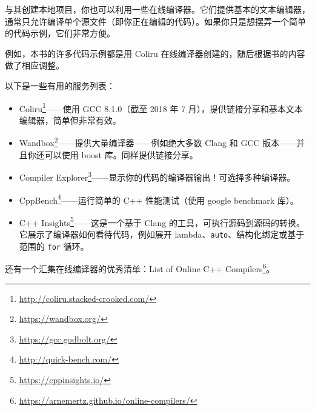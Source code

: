 与其创建本地项目，你也可以利用一些在线编译器。它们提供基本的文本编辑器，通常只允许编译单个源文件（即你正在编辑的代码）。如果你只是想摆弄一个简单的代码示例，它们非常方便。

例如，本书的许多代码示例都是用 Coliru 在线编译器创建的，随后根据书的内容做了相应调整。

以下是一些有用的服务列表：

\begin{itemize}
  \item Coliru\footnote{\url{http://coliru.stacked-crooked.com/}}——使用 GCC 8.1.0（截至 2018 年 7 月），提供链接分享和基本文本编辑器，简单但非常有效。
  \item Wandbox\footnote{\url{https://wandbox.org/}}——提供大量编译器——例如绝大多数 Clang 和 GCC 版本——并且你还可以使用 boost 库。同样提供链接分享。
  \item Compiler Explorer\footnote{\url{https://gcc.godbolt.org/}}——显示你的代码的编译器输出！可选择多种编译器。
  \item CppBench\footnote{\url{http://quick-bench.com/}}——运行简单的 C++ 性能测试（使用 google benchmark 库）。
  \item C++ Insights\footnote{\url{https://cppinsights.io/}}——这是一个基于 Clang 的工具，可执行源码到源码的转换。它展示了编译器如何看待代码，例如展开 lambda、\texttt{auto}、结构化绑定或基于范围的 \texttt{for} 循环。
\end{itemize}

还有一个汇集在线编译器的优秀清单：List of Online C++ Compilers\footnote{\url{https://arnemertz.github.io/online-compilers/}}。
